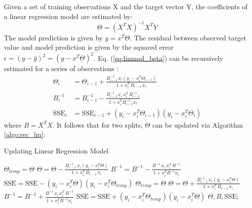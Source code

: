 \documentclass[a4paper, 11pt]{article}
\begin{document}
Given a set of training observations X and the target vector Y, the coefficients of a  linear regression model are estimated by:
\begin{equation}
\Theta = (X^TX)^{-1}X^TY
\label{eq:linmod_beta}
\end{equation}
The model prediction is given by $y = x^T \Theta$. The residual between observed target value and model prediction is given by the squared error $\epsilon = (y - \hat{y})^2 = (y - x^T \Theta)^2$. Eq. (\ref{eq:linmod_beta}) can be recursively estimated for a series of observations \cite{potts_incremental_model_tree}:
\begin{align*}
    \Theta_i &= \Theta_{i - 1} + \frac{B^{-1}_{i-1} \, x_i \left(y_i - x_i^T\Theta_{i-1}\right)}{1 + x_i^T \, B_{i-1} \, x_i} \\
    B^{-1}_i &= B^{-1}_{i-1} - \frac{B^{-1}_{i-1} \, x_i \, x_i^T \, B^{-1}_{i-1}}{1 + x_i^T B^{-1}_{i-1} x_i} \\
    \text{SSE}_i &= \text{SSE}_{i-1} + \left(y_i - x_i^T \Theta_{i-1}\right) \left(y_i - x_i^T \Theta_i\right)
\end{align*}
where $B = X^TX$.
It follows that for two splits, $\Theta$ can be updated via Algorithm \ref{algo:rec_lm}:
\begin{algorithm}
 \caption{Updating Linear Regression Model \label{algo:rec_lm}}
 \begin{algorithmic}[1]
 \renewcommand{\algorithmicrequire}{\textbf{Input}: $\Theta, B, \text{SSE}, \mathcal{D}_0, \mathcal{D}_1$}
 \renewcommand{\algorithmicensure}{\textbf{Output}: $\Theta_{updated}, \text{B}_{updated}, \text{SSE}_{updated}$}
 \REQUIRE
 \ENSURE
    \STATE
    $\Theta_{temp} = \Theta$
    \STATE
    $\Theta = \Theta - \frac{B^{-1}_{i-1} \, x_i \left(y_i - x_i^T\Theta\right)}{1 + x_i^T \, B_{i-1} \, x_i}$
    \STATE
    $B^{-1} = B^{-1} - \frac{B^{-1} \, x_i \, x_i^T \, B^{-1}}{1 + x_i^T B^{-1} x_i}$
    \STATE
    $\text{SSE} = \text{SSE} - \left(y_i - x_i^T \Theta\right) \left(y_i - x_i^T \Theta_{temp}\right)$
 \ENDFOR 
    \STATE
    $\Theta_{temp} = \Theta$
    \STATE
    $\Theta = \Theta + \frac{B^{-1}_{i-1} \, x_i \left(y_i - x_i^T\Theta\right)}{1 + x_i^T \, B_{i-1} \, x_i}$
    \STATE
    $B^{-1} = B^{-1} + \frac{B^{-1} \, x_i \, x_i^T \, B^{-1}}{1 + x_i^T B^{-1} x_i}$
    \STATE
    $\text{SSE} = \text{SSE} + \left(y_i - x_i^T \Theta_{temp}\right) \left(y_i - x_i^T \Theta\right)$
 \ENDFOR
 \RETURN $\Theta, B, \text{SSE}$;
 \end{algorithmic} 
\end{algorithm}
\end{document}
